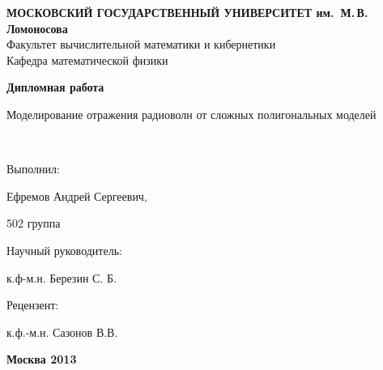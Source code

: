 \documentclass{scrartcl}
\begin{document}
\thispagestyle{empty} 
\begin{center}
{\bfseries МОСКОВСКИЙ ГОСУДАРСТВЕННЫЙ УНИВЕРСИТЕТ им.~М.{\,}В.{\,}Ломоносова}\\
\vspace{2ex}Факультет вычислительной математики и кибернетики\\
\vspace{2ex}Кафедра математической физики
\end{center}


\vfill

\begin{center}
{\huge {\bfseries Дипломная работа

\vspace*{1cm}

Моделирование отражения радиоволн от сложных полигональных моделей}\\[25mm] }

\end{center}

\vfill

\hspace*{7cm} Выполнил:

\hspace*{7cm} Ефремов Андрей Сергеевич,

\hspace*{7cm} 502 группа

\hspace*{7cm} Научный руководитель:

\hspace*{7cm} к.ф-м.н. Березин С. Б.

\hspace*{7cm} Рецензент:

\hspace*{7cm} к.ф.-м.н. Сазонов В.В.
\bigskip

\vfill

\begin{center}
{\bfseries Москва 2013} 	
\end{center}


  
  
  
  
  
  
  
  
  
\end{document}
